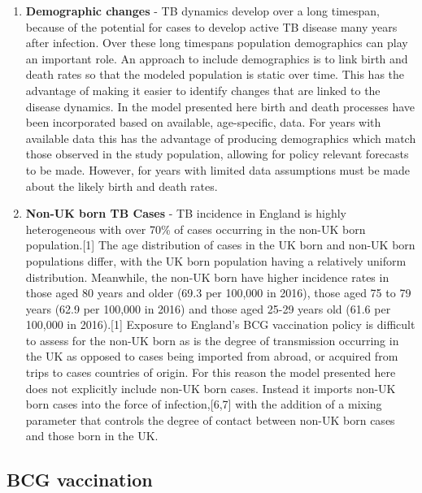\documentclass[11pt,twoside]{bristolthesis}
\begin{document}
\begin{enumerate}
  \item
    \textbf{Demographic changes} - TB dynamics develop over a long timespan, because of the potential for cases to develop active TB disease many years after infection. Over these long timespans population demographics can play an important role. An approach to include demographics is to link birth and death rates so that the modeled population is static over time. This has the advantage of making it easier to identify changes that are linked to the disease dynamics. In the model presented here birth and death processes have been incorporated based on available, age-specific, data. For years with available data this has the advantage of producing demographics which match those observed in the study population, allowing for policy relevant forecasts to be made. However, for years with limited data assumptions must be made about the likely birth and death rates.
  \item
    \textbf{Non-UK born TB Cases} - TB incidence in England is highly heterogeneous with over 70\% of cases occurring in the non-UK born population.{[}1{]} The age distribution of cases in the UK born and non-UK born populations differ, with the UK born population having a relatively uniform distribution. Meanwhile, the non-UK born have higher incidence rates in those aged 80 years and older (69.3 per 100,000 in 2016), those aged 75 to 79 years (62.9 per 100,000 in 2016) and those aged 25-29 years old (61.6 per 100,000 in 2016).{[}1{]} Exposure to England's BCG vaccination policy is difficult to assess for the non-UK born as is the degree of transmission occurring in the UK as opposed to cases being imported from abroad, or acquired from trips to cases countries of origin. For this reason the model presented here does not explicitly include non-UK born cases. Instead it imports non-UK born cases into the force of infection,{[}6,7{]} with the addition of a mixing parameter that controls the degree of contact between non-UK born cases and those born in the UK.
  \end{enumerate}
  \hypertarget{bcg-vaccination}{%
  \subsection{BCG vaccination}\label{bcg-vaccination}}
  
\end{document}

